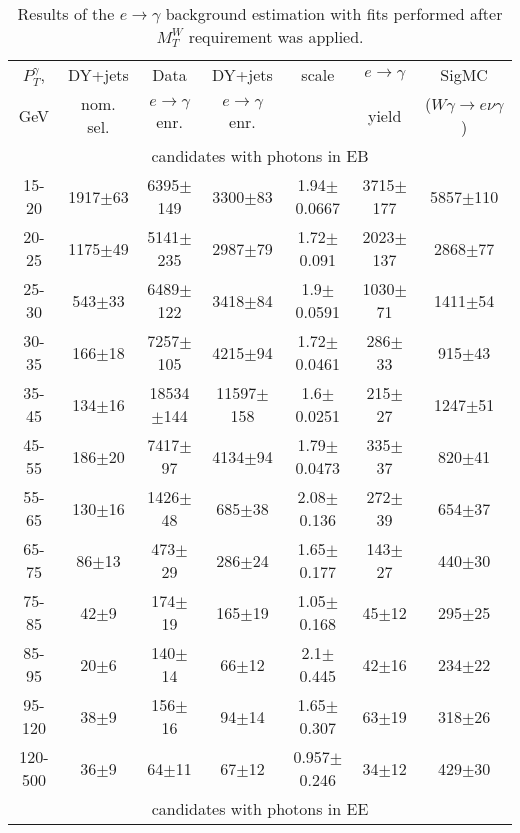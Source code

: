 \begin{table}[h]
  \scriptsize
  \begin{center}
  \caption{Results of the $e\rightarrow\gamma$ background estimation with fits performed after $M_T^W$ requirement was applied.} 
   \begin{tabular}{|c|c|c|c|c|c|c|}
 $P_T^{\gamma}$,  & DY+jets    & Data                      & DY+jets & scale & $e\rightarrow\gamma$ & SigMC\\ 
 GeV            & nom. sel. & $e\rightarrow\gamma$ enr. & $e\rightarrow\gamma$ enr. & & yield & ($W\gamma\rightarrow e\nu\gamma$)\\ \hline
 \multicolumn{7}{|c|}{candidates with photons in EB}\\ 
15-20 & 1917$\pm$63 & 6395$\pm$149 & 3300$\pm$83 & 1.94$\pm$0.0667& 3715$\pm$177& 5857$\pm$110 \\ \hline
20-25 & 1175$\pm$49 & 5141$\pm$235 & 2987$\pm$79 & 1.72$\pm$0.091& 2023$\pm$137& 2868$\pm$77 \\ \hline
25-30 & 543$\pm$33 & 6489$\pm$122 & 3418$\pm$84 & 1.9$\pm$0.0591& 1030$\pm$71& 1411$\pm$54 \\ \hline
30-35 & 166$\pm$18 & 7257$\pm$105 & 4215$\pm$94 & 1.72$\pm$0.0461& 286$\pm$33& 915$\pm$43 \\ \hline
35-45 & 134$\pm$16 & 18534$\pm$144 & 11597$\pm$158 & 1.6$\pm$0.0251& 215$\pm$27& 1247$\pm$51 \\ \hline
45-55 & 186$\pm$20 & 7417$\pm$97 & 4134$\pm$94 & 1.79$\pm$0.0473& 335$\pm$37& 820$\pm$41 \\ \hline
55-65 & 130$\pm$16 & 1426$\pm$48 & 685$\pm$38 & 2.08$\pm$0.136& 272$\pm$39& 654$\pm$37 \\ \hline
65-75 & 86$\pm$13 & 473$\pm$29 & 286$\pm$24 & 1.65$\pm$0.177& 143$\pm$27& 440$\pm$30 \\ \hline
75-85 & 42$\pm$9 & 174$\pm$19 & 165$\pm$19 & 1.05$\pm$0.168& 45$\pm$12& 295$\pm$25 \\ \hline
85-95 & 20$\pm$6 & 140$\pm$14 & 66$\pm$12 & 2.1$\pm$0.445& 42$\pm$16& 234$\pm$22 \\ \hline
95-120 & 38$\pm$9 & 156$\pm$16 & 94$\pm$14 & 1.65$\pm$0.307& 63$\pm$19& 318$\pm$26 \\ \hline
120-500 & 36$\pm$9 & 64$\pm$11 & 67$\pm$12 & 0.957$\pm$0.246& 34$\pm$12& 429$\pm$30 \\ \hline
\multicolumn{7}{|c|}{candidates with photons in EE}\\ 

\end{tabular}
\end{center}
\end{table}
